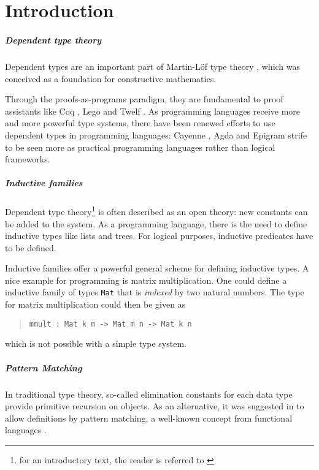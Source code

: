 \chapter{Introduction}

\paragraph*{Dependent type theory}

Dependent types are an important part of Martin-L\"of type theory \cite{mart84}, which 
was conceived as a foundation for constructive mathematics.

Through the proofs-as-programs paradigm, they are fundamental to proof assistants 
like Coq \cite{coq}, Lego \cite{pollack94theory} and Twelf \cite{pfenning99system}.
As programming languages receive more and more powerful type systems, there have been renewed efforts to use dependent types in programming languages: Cayenne \cite{augustsson98cayenne}, Agda \cite{norell:thesis} and Epigram \cite{epigram} strife to be seen more as practical programming languages rather than logical frameworks.

\paragraph*{Inductive families}
Dependent type theory\footnote{for an introductory text, the reader is referred to \cite{NPS:promlt}}
 is often described as an open theory: new constants can be added to the system.
As a programming language, there is the need to define inductive types like lists and trees.
For logical purposes, inductive predicates have to be defined. 

Inductive families \cite{dybjer94inductive} offer a powerful general scheme for defining inductive types.  
A nice example for programming is matrix multiplication.
One could define a inductive family of types \verb+Mat+ that is \emph{indexed} by two natural numbers.
The type for matrix multiplication could then be given as 
\begin{quote}
\begin{verbatim}
mmult : Mat k m -> Mat m n -> Mat k n 
\end{verbatim}
\end{quote}
which is not possible with a simple type system.
\paragraph*{Pattern Matching}
In traditional type theory, so-called elimination constants for each data type provide primitive recursion on objects. 
As an alternative, it was suggested in \cite{coquand92pattern} to allow definitions by pattern matching, a well-known concept from functional languages \cite{DBLP:conf/fpca/Augustsson85}.

